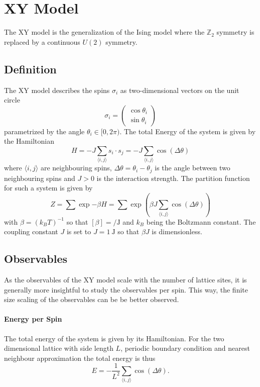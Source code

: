 \section{XY Model}\label{sec:theo:xy_model}
	The XY model is the generalization of the Ising model where the $\mathbb{Z}_2$ symmetry is replaced by a continuous $U(2)$ symmetry.
	
	\subsection{Definition}
		The XY model describes the spins $\sigma_i$ as two-dimensional vectors on the unit circle
		\begin{equation}\label{eq:hamiltonian}
			\sigma_i = \begin{pmatrix}
				\cos{\theta_i} \\ \sin{\theta_i}
			\end{pmatrix}
		\end{equation}
		parametrized by the angle $\theta_i \in [0,2\pi)$. The total Energy of the system is given by the Hamiltonian
		\begin{equation}
			H = -J \sum_{\langle i, j \rangle}{s_i \cdot s_j} = -J \sum_{\langle i, j \rangle}{\cos(\Delta \theta)}
		\end{equation}
		where $\langle i,j \rangle$ are neighbouring spins, $\Delta \theta = \theta_i - \theta_j$ is the angle between two neighbouring spins and $J>0$ is the interaction strength. The partition function for such a system is given by
		\begin{equation}
			Z = \sum{\exp{-\beta H}} = \sum{\exp{ \left( \beta J \sum_{\langle i, j \rangle}{\cos(\Delta \theta)} \right) }}
		\end{equation}
		with $\beta = (k_B T)^{-1}$ so that $[\beta] = \si{\per\joule}$ and $k_B$ being the Boltzmann constant. The coupling constant $J$ is set to $J = \SI{1}{\joule}$ so that $\beta J$ is dimensionless. 
		
	\subsection{Observables}
		As the observables of the XY model scale with the number of lattice sites, it is generally more insightful to study the observables per spin. This way, the finite size scaling of the observables can be be better observed.
	
		\paragraph{Energy per Spin}
			The total energy of the system is given by its Hamiltonian. For the two dimensional lattice with side length $L$, periodic boundary condition and nearest neighbour approximation the total energy is thus
			\begin{equation}
				E = - \frac{1}{L^2} \sum_{\langle i, j \rangle}{\cos(\Delta \theta)}.
			\end{equation}
		
